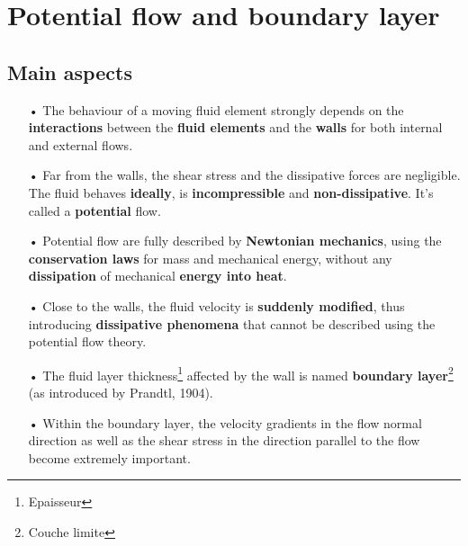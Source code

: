 \section{Potential flow and boundary layer}
\subsection{Main aspects}
\begin{itemize}
	\item[•] The behaviour of a moving fluid element strongly depends on the \textbf{interactions} between the \textbf{fluid elements} and the \textbf{walls} for both internal and external flows. \\
	      	
	\item[•] Far from the walls, the shear stress and the dissipative forces are negligible. The fluid behaves \textbf{ideally}, is \textbf{incompressible} and \textbf{non-dissipative}. It's called a \textbf{potential} flow. \\
	      	
	\item[•] Potential flow are fully described by \textbf{Newtonian mechanics}, using the \textbf{conservation laws} for mass and mechanical energy, without any \textbf{dissipation} of mechanical \textbf{energy into heat}. \\
	      	
	\item[•] Close to the walls, the fluid velocity is \textbf{suddenly modified}, thus introducing \textbf{dissipative phenomena} that cannot be described using the potential flow theory.
	      	
	\item[•] The fluid layer thickness\footnote{Epaisseur} affected by the wall is named \textbf{boundary layer}\footnote{Couche limite} (as introduced by Prandtl, 1904).\\
	      	
	\item[•] Within the boundary layer, the velocity gradients in the flow normal direction as well as the shear stress in the direction parallel to the flow become extremely important.
\end{itemize}
	
\newpage
	
